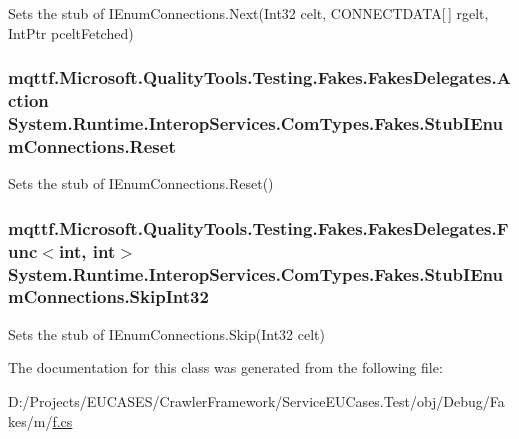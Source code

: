 Sets the stub of I\-Enum\-Connections.\-Next(\-Int32 celt, C\-O\-N\-N\-E\-C\-T\-D\-A\-T\-A\mbox{[}$\,$\mbox{]} rgelt, Int\-Ptr pcelt\-Fetched)

\hypertarget{class_system_1_1_runtime_1_1_interop_services_1_1_com_types_1_1_fakes_1_1_stub_i_enum_connections_a5905d654d6e3869d3ed2a309c814bcae}{
\subsubsection[{Reset}]{\setlength{\rightskip}{0pt plus 5cm}mqttf.\-Microsoft.\-Quality\-Tools.\-Testing.\-Fakes.\-Fakes\-Delegates.\-Action System.\-Runtime.\-Interop\-Services.\-Com\-Types.\-Fakes.\-Stub\-I\-Enum\-Connections.\-Reset}}\label{class_system_1_1_runtime_1_1_interop_services_1_1_com_types_1_1_fakes_1_1_stub_i_enum_connections_a5905d654d6e3869d3ed2a309c814bcae}


Sets the stub of I\-Enum\-Connections.\-Reset()

\hypertarget{class_system_1_1_runtime_1_1_interop_services_1_1_com_types_1_1_fakes_1_1_stub_i_enum_connections_a2755f50a46419d2735387adb8f50441f}{
\subsubsection[{Skip\-Int32}]{\setlength{\rightskip}{0pt plus 5cm}mqttf.\-Microsoft.\-Quality\-Tools.\-Testing.\-Fakes.\-Fakes\-Delegates.\-Func$<$int, int$>$ System.\-Runtime.\-Interop\-Services.\-Com\-Types.\-Fakes.\-Stub\-I\-Enum\-Connections.\-Skip\-Int32}}\label{class_system_1_1_runtime_1_1_interop_services_1_1_com_types_1_1_fakes_1_1_stub_i_enum_connections_a2755f50a46419d2735387adb8f50441f}


Sets the stub of I\-Enum\-Connections.\-Skip(\-Int32 celt)



The documentation for this class was generated from the following file\-:\begin{DoxyCompactItemize}
\item 
D\-:/\-Projects/\-E\-U\-C\-A\-S\-E\-S/\-Crawler\-Framework/\-Service\-E\-U\-Cases.\-Test/obj/\-Debug/\-Fakes/m/\hyperlink{m_2f_8cs}{f.\-cs}\end{DoxyCompactItemize}
